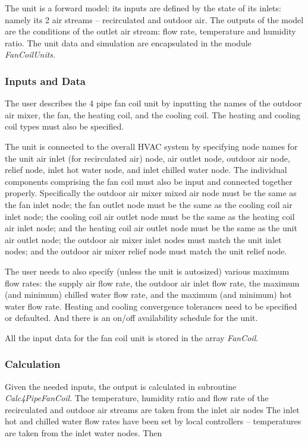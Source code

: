 The unit is a forward model: its inputs are defined by the state of its inlets: namely its 2 air streams -- recirculated and outdoor air. The outputs of the model are the conditions of the outlet air stream: flow rate, temperature and humidity ratio. The unit data and simulation are encapsulated in the module \emph{FanCoilUnits.}

\subsubsection{Inputs and Data}\label{inputs-and-data-4}

The user describes the 4 pipe fan coil unit by inputting the names of the outdoor air mixer, the fan, the heating coil, and the cooling coil. The heating and cooling coil types must also be specified.

The unit is connected to the overall HVAC system by specifying node names for the unit air inlet (for recirculated air) node, air outlet node, outdoor air node, relief node, inlet hot water node, and inlet chilled water node. The individual components comprising the fan coil must also be input and connected together properly. Specifically the outdoor air mixer mixed air node must be the same as the fan inlet node; the fan outlet node must be the same as the cooling coil air inlet node; the cooling coil air outlet node must be the same as the heating coil air inlet node; and the heating coil air outlet node must be the same as the unit air outlet node; the outdoor air mixer inlet nodes must match the unit inlet nodes; and the outdoor air mixer relief node must match the unit relief node.

The user needs to also specify (unless the unit is autosized) various maximum flow rates: the supply air flow rate, the outdoor air inlet flow rate, the maximum (and minimum) chilled water flow rate, and the maximum (and minimum) hot water flow rate. Heating and cooling convergence tolerances need to be specified or defaulted. And there is an on/off availability schedule for the unit.

All the input data for the fan coil unit is stored in the array \emph{FanCoil}.

\subsubsection{Calculation}\label{calculation-3-000}

Given the needed inputs, the output is calculated in subroutine \emph{Calc4PipeFanCoil}. The temperature, humidity ratio and flow rate of the recirculated and outdoor air streams are taken from the inlet air nodes The inlet hot and chilled water flow rates have been set by local controllers -- temperatures are taken from the inlet water nodes. Then

